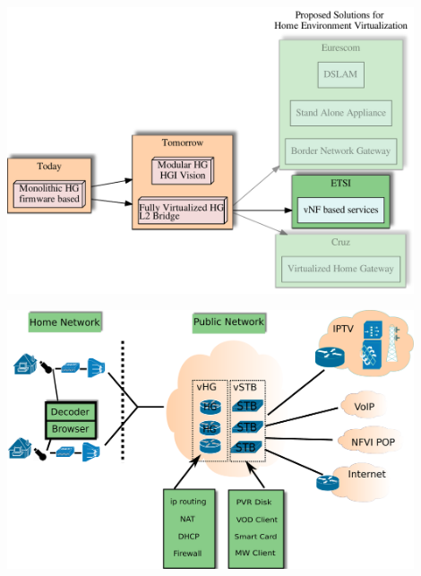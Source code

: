 \documentclass[a4paper]{beamer}
\begin{document}
\begin{frame}[plain,T]{}
	\includegraphics[width=0.9\textwidth]{vhgtrends-etsi-emphasis.pdf}
\end{frame}

\begin{frame}[plain,T]{}
\begin{centering}
	\includegraphics[width=0.9\textwidth]{etsi-virtualisation-home-env.pdf}
\end{centering}
	
\end{frame}
\end{document}
